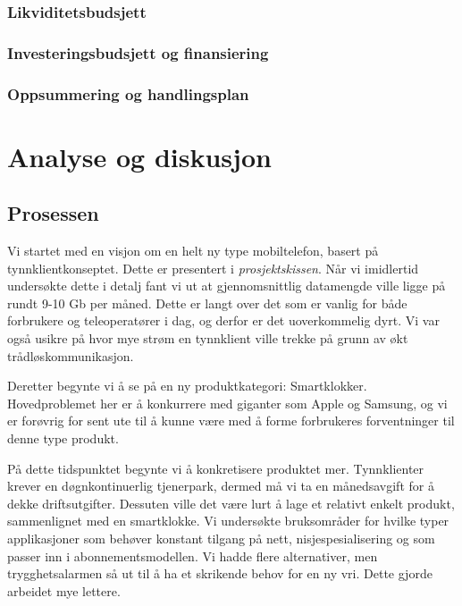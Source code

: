 
\subsection{Likviditetsbudsjett}

\subsection{Investeringsbudsjett og finansiering}

\subsection{Oppsummering og handlingsplan}

\chapter{Analyse og diskusjon}

\section{Prosessen}
\label{prosessen}

Vi startet med en visjon om en helt ny type mobiltelefon, basert på
tynnklientkonseptet. Dette er presentert i \textit{prosjektskissen}. Når vi
imidlertid undersøkte dette i detalj fant vi ut at gjennomsnittlig datamengde
ville ligge på rundt 9-10 Gb per måned. Dette er langt over det som er vanlig
for både forbrukere og teleoperatører i dag, og derfor er det uoverkommelig
dyrt. Vi var også usikre på hvor mye strøm en tynnklient ville trekke på grunn
av økt trådløskommunikasjon.

Deretter begynte vi å se på en ny produktkategori: Smartklokker. Hovedproblemet
her er å konkurrere med giganter som Apple og Samsung, og vi er forøvrig for
sent ute til å kunne være med å forme forbrukeres forventninger til denne type
produkt.

På dette tidspunktet begynte vi å konkretisere produktet mer. Tynnklienter
krever en døgnkontinuerlig tjenerpark, dermed må vi ta en månedsavgift for å
dekke driftsutgifter. Dessuten ville det være lurt å lage et relativt enkelt
produkt, sammenlignet med en smartklokke. Vi undersøkte bruksområder for hvilke
typer applikasjoner som behøver konstant tilgang på nett, nisjespesialisering og som passer inn i
abonnementsmodellen. Vi hadde flere alternativer, men trygghetsalarmen så ut
til å ha et skrikende behov for en ny vri. Dette gjorde arbeidet mye lettere.

